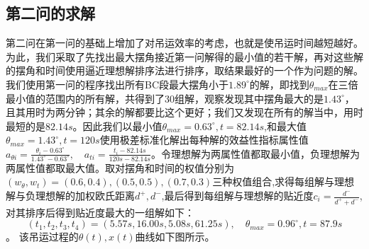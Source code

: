 \documentclass[withoutpreface,bwprint]{cumcmthesis} %
\begin{document}
\subsection{第二问的求解}
第二问在第一问的基础上增加了对吊运效率的考虑，也就是使吊运时间越短越好。为此，我们采取了先找出最大摆角接近第一问解得的最小值的若干解，再对这些解的摆角和时间使用逼近理想解排序法进行排序，取结果最好的一个作为问题的解。我们使用第一问的程序找出所有BC段最大摆角小于$1.89^{\circ}$的解，即找到$\theta_{max}$在三倍最小值的范围内的所有解，共得到了30组解，观察发现其中摆角最大的是$1.43^{\circ}$，且其用时为两分钟；其余的解都要比这个更好；我们又发现在所有的解当中，用时最短的是$82.14s$。因此我们以最小值$\theta_{max}=0.63^{\circ},t=82.14s$,和最大值$\theta_{max}=1.43^{\circ},t=120s$使用极差标准化解出每种解的效益性指标属性值$a_{\theta i}=\frac{\theta_i-0.63^{\circ}}{1.43^{\circ}-0.63^{\circ}},\quad a_{ti}=\frac{t_i-82.14s}{120s-82.14s}$。令理想解为两属性值都取最小值，负理想解为两属性值都取最大值。取对摆角和时间的权值分别为$(w_{\theta},w_t)=(0.6,0.4),(0.5,0.5),(0.7,0.3)$三种权值组合,求得每组解与理想解与负理想解的加权欧氏距离$d^+,d^-$,最后得到每组解与理想解的贴近度$c_i=\frac{d^-}{d^++d^-}$,对其排序后得到贴近度最大的一组解如下：
$$(t_1,t_2,t_3,t_4)=(5.57s,16.00s,5.08s,61.25s),\quad \theta_{max}=0.96^{\circ},t=87.9s$$。
该吊运过程的$\theta(t),x(t)$曲线如下图所示。
\end{document}
